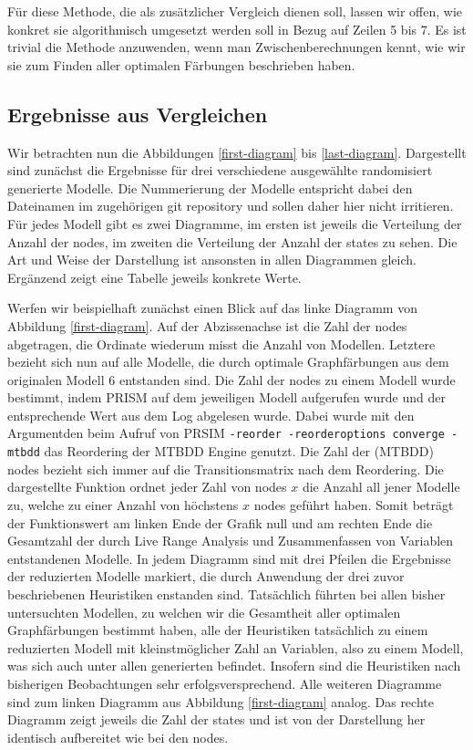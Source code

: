 \documentclass[a4paper]{article}
\theoremstyle{nonumberplain}
\begin{document}
Für diese Methode, die als zusätzlicher Vergleich dienen soll, lassen wir offen, wie konkret sie algorithmisch umgesetzt werden soll in Bezug auf Zeilen 5 bis 7. Es ist trivial die Methode anzuwenden, wenn man Zwischenberechnungen kennt, wie wir sie zum Finden aller optimalen Färbungen beschrieben haben.


\subsection{Ergebnisse aus Vergleichen}

Wir betrachten nun die Abbildungen \ref{first-diagram} bis \ref{last-diagram}. Dargestellt sind zunächst die Ergebnisse für drei verschiedene ausgewählte randomisiert generierte Modelle. Die Nummerierung der Modelle entspricht dabei den Dateinamen im zugehörigen git repository und sollen daher hier nicht irritieren. Für jedes Modell gibt es zwei Diagramme, im ersten ist jeweils die Verteilung der Anzahl der nodes, im zweiten die Verteilung der Anzahl der states zu sehen. Die Art und Weise der Darstellung ist ansonsten in allen Diagrammen gleich. Ergänzend zeigt eine Tabelle jeweils konkrete Werte.

Werfen wir beispielhaft zunächst einen Blick auf das linke Diagramm von Abbildung \ref{first-diagram}. Auf der Abzissenachse ist die Zahl der nodes abgetragen, die Ordinate wiederum misst die Anzahl von Modellen. Letztere bezieht sich nun auf alle Modelle, die durch optimale Graphfärbungen aus dem originalen Modell 6 entstanden sind. Die Zahl der nodes zu einem Modell wurde bestimmt, indem PRISM auf dem jeweiligen Modell aufgerufen wurde und der entsprechende Wert aus dem Log abgelesen wurde. Dabei wurde mit den Argumentden beim Aufruf von PRSIM \texttt{-reorder -reorderoptions converge -mtbdd} das Reordering der MTBDD Engine genutzt. Die Zahl der (MTBDD) nodes bezieht sich immer auf die Transitionsmatrix nach dem Reordering.
Die dargestellte Funktion ordnet jeder Zahl von nodes $x$ die Anzahl all jener Modelle zu, welche zu einer Anzahl von höchstens $x$ nodes geführt haben. Somit beträgt der Funktionswert am linken Ende der Grafik null und am rechten Ende die Gesamtzahl der durch Live Range Analysis und Zusammenfassen von Variablen entstandenen Modelle. In jedem Diagramm sind mit drei Pfeilen die Ergebnisse der reduzierten Modelle markiert, die durch Anwendung der drei zuvor beschriebenen Heuristiken enstanden sind. Tatsächlich führten bei allen bisher untersuchten Modellen, zu welchen wir die Gesamtheit aller optimalen Graphfärbungen bestimmt haben, alle der Heuristiken tatsächlich zu einem reduzierten Modell mit kleinstmöglicher Zahl an Variablen, also zu einem Modell, was sich auch unter allen generierten befindet.
Insofern sind die Heuristiken nach bisherigen Beobachtungen sehr erfolgsversprechend.
Alle weiteren Diagramme sind zum linken Diagramm aus Abbildung \ref{first-diagram} analog. Das rechte Diagramm zeigt jeweils die Zahl der states und ist von der Darstellung her identisch aufbereitet wie bei den nodes.
\end{document}
